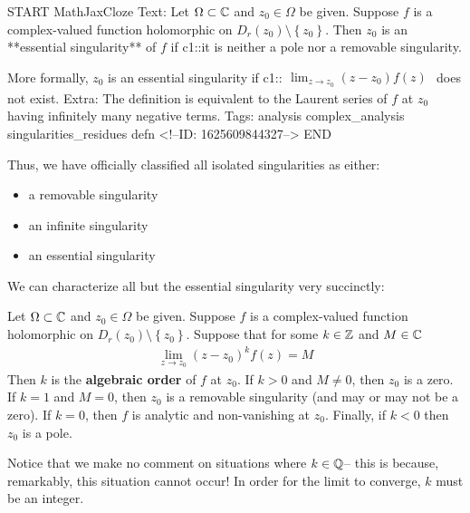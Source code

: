 \documentclass{memoir}
\begin{document}
\begin{anki}
START
MathJaxCloze
Text: Let \(\Omega \subset \mathbb{C}\) and \(z_0 \in \Omega \) be given. Suppose \(f\) is a complex-valued function holomorphic on \(D_r(z_0) \setminus\left\{ z_0 \right\} \). Then \(z_0\) is an **essential singularity** of \(f\) if {{c1::it is neither a pole nor a removable singularity}}.

More formally, \(z_0\) is an essential singularity if
{{c1::\(\begin{align*}
        	\lim_{z \to z_0} (z-z_0)f(z)
        \end{align*}\)
does not exist.}} 
Extra: The definition is equivalent to the Laurent series of \(f\) at \(z_0\) having infinitely many negative terms.
Tags: analysis complex_analysis singularities_residues defn
<!--ID: 1625609844327-->
END
\end{anki}


Thus, we have officially classified all isolated singularities as either:
\begin{itemize}
	\item a removable singularity
	\item an infinite singularity
	\item an essential singularity
\end{itemize}
We can characterize all but the essential singularity very succinctly:
\begin{defn}
	Let \(\Omega \subset \mathbb{C}\) and \(z_0 \in \Omega \) be given. Suppose \(f\) is a complex-valued function holomorphic on \(D_r(z_0)\setminus\left\{ z_0 \right\} \). Suppose that for some \(k \in \mathbb{Z}\) and \(M \in \mathbb{C}\)
	\begin{align*}
	\lim_{z \to z_0} (z-z_0)^{k}f(z) =M
	\end{align*}
	Then \(k\) is the \textbf{algebraic order} of \(f\) at \(z_0\). If \(k>0\) and \(M\neq 0\), then \(z_0\) is a zero. If \(k=1\) and \(M=0\), then \(z_0\) is a removable singularity (and may or may not be a zero). If \(k=0\), then \(f\) is analytic and non-vanishing at \(z_0\). Finally, if \(k<0\) then \(z_0\) is a pole. 
\end{defn}
Notice that we make no comment on situations where \(k \in \mathbb{Q}\)-- this is because, remarkably, this situation cannot occur! In order for the limit to converge, \(k\) must be an integer.\\
\end{document}
